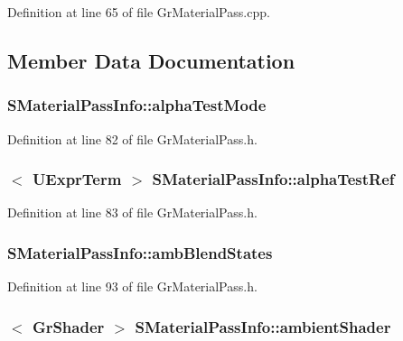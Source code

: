 Definition at line 65 of file GrMaterialPass.cpp.

\subsection{Member Data Documentation}
\hypertarget{struct_s_material_pass_info_8c047353d3e838c5a3d11ba448847d23}{
\subsubsection[{alphaTestMode}]{ {\bf SMaterialPassInfo::alphaTestMode}}}
\label{struct_s_material_pass_info_8c047353d3e838c5a3d11ba448847d23}




Definition at line 82 of file GrMaterialPass.h.\hypertarget{struct_s_material_pass_info_9209733df2e6a655d595dfc1d810b28f}{
\subsubsection[{alphaTestRef}]{$<$ {\bf UExprTerm} $>$ {\bf SMaterialPassInfo::alphaTestRef}}}
\label{struct_s_material_pass_info_9209733df2e6a655d595dfc1d810b28f}




Definition at line 83 of file GrMaterialPass.h.\hypertarget{struct_s_material_pass_info_855f746e614b3eb8146603d2efe46663}{
\subsubsection[{ambBlendStates}]{ {\bf SMaterialPassInfo::ambBlendStates}}}
\label{struct_s_material_pass_info_855f746e614b3eb8146603d2efe46663}




Definition at line 93 of file GrMaterialPass.h.\hypertarget{struct_s_material_pass_info_b355f2664fb9a12aaf019c80a5b54a03}{
\subsubsection[{ambientShader}]{$<$ {\bf GrShader} $>$ {\bf SMaterialPassInfo::ambientShader}}}
\label{struct_s_material_pass_info_b355f2664fb9a12aaf019c80a5b54a03}




